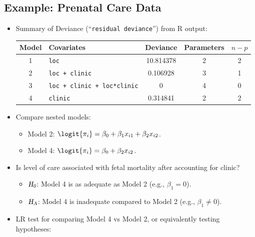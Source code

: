 \documentclass{article}\usepackage[]{graphicx}\usepackage[svgnames]{xcolor}
\newcommand{\HN}{\textsl{H}_{\textsl{0}}}%
\newcommand{\HA}{\textsl{H}_{\textsl{A}}}%
\begin{document}
\subsection*{Example: Prenatal Care Data}
\begin{itemize}
      \item Summary of Deviance (``\texttt{residual deviance}'') from R output:
            \begin{table}[!htbp]
                  \centering
                  \begin{tabular}{clccc}
                        \toprule
                        Model & Covariates                         & Deviance  & Parameters & $ n-p $ \\
                        \midrule
                        1     & \texttt{loc}                       & 10.814378 & 2          & 2       \\
                        2     & \texttt{loc + clinic}              & 0.106928  & 3          & 1       \\
                        3     & \texttt{loc + clinic + loc*clinic} & 0         & 4          & 0       \\
                        4     & \texttt{clinic}                    & 0.314841  & 2          & 2       \\
                        \bottomrule
                  \end{tabular}
            \end{table}
      \item Compare nested models:
            \begin{itemize}
                  \item Model 2: $ \logit{\pi_i}=\beta_0+\beta_1x_{i1}+\beta_2x_{i2} $.
                  \item Model 4: $ \logit{\pi_i}=\beta_0+\beta_2x_{i2} $.
            \end{itemize}
      \item Is level of care associated with fetal mortality after accounting for clinic?
            \begin{itemize}
                  \item $ \HN $: Model 4 is as adequate as Model 2 (e.g., $ \beta_1=0 $).
                  \item $ \HA $: Model 4 is inadequate compared to Model 2 (e.g., $ \beta_1\ne 0 $).
            \end{itemize}
      \item LR test for comparing Model 4 vs Model 2, or equivalently testing hypotheses:

\end{itemize}
\end{document}
